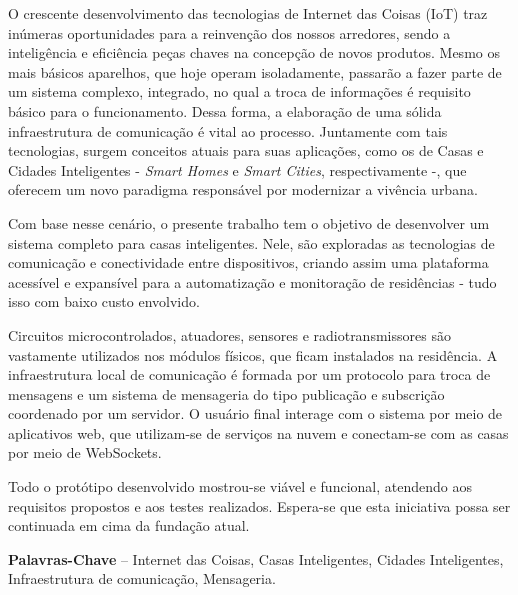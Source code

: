 \begin{resumo}
O crescente desenvolvimento das tecnologias de Internet das Coisas (IoT) traz inúmeras oportunidades para a reinvenção dos nossos arredores, sendo a inteligência e eficiência peças chaves na concepção de novos produtos. Mesmo os mais básicos aparelhos, que hoje operam isoladamente, passarão a fazer parte de um sistema complexo, integrado, no qual a troca de informações é requisito básico para o funcionamento. Dessa forma, a elaboração de uma sólida infraestrutura de comunicação é vital ao processo. Juntamente com tais tecnologias, surgem conceitos atuais para suas aplicações, como os de Casas e Cidades Inteligentes - \textit{Smart Homes} e \textit{Smart Cities}, respectivamente -, que oferecem um novo paradigma responsável por modernizar a vivência urbana.

Com base nesse cenário, o presente trabalho tem o objetivo de desenvolver um sistema completo para casas inteligentes. Nele, são exploradas as tecnologias de comunicação e conectividade entre dispositivos, criando assim uma plataforma acessível e expansível para a automatização e monitoração de residências - tudo isso com baixo custo envolvido.

Circuitos microcontrolados, atuadores, sensores e radiotransmissores são vastamente utilizados nos módulos físicos, que ficam instalados na residência. A infraestrutura local de comunicação é formada por um protocolo para troca de mensagens e um sistema de mensageria do tipo publicação e subscrição coordenado por um servidor. O usuário final interage com o sistema por meio de aplicativos web, que utilizam-se de serviços na nuvem e conectam-se com as casas por meio de WebSockets.

Todo o protótipo desenvolvido mostrou-se viável e funcional, atendendo aos requisitos propostos e aos testes realizados. Espera-se que esta iniciativa possa ser continuada em cima da fundação atual.

%
\textbf{Palavras-Chave} -- Internet das Coisas, Casas Inteligentes, Cidades Inteligentes, Infraestrutura de comunicação, Mensageria.
\end{resumo}
